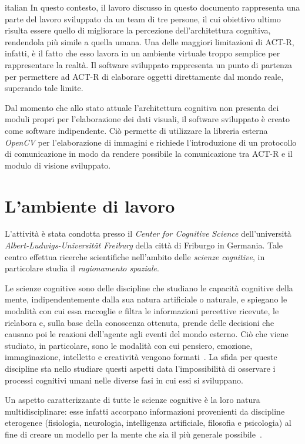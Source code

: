 \begin{otherlanguage*}{italian}
	In questo contesto, il lavoro discusso in questo documento rappresenta una parte del lavoro sviluppato da un team di tre persone, il cui obiettivo ultimo risulta essere quello di migliorare la percezione dell'architettura cognitiva, rendendola più simile a quella umana.  
	Una delle maggiori limitazioni di \mbox{ACT-R}, infatti, è il fatto che esso lavora in un ambiente virtuale troppo semplice per rappresentare la realtà. 
	Il software sviluppato rappresenta un punto di partenza per permettere ad \mbox{ACT-R} di elaborare oggetti direttamente dal mondo reale, superando tale limite.
	 
	Dal momento che allo stato attuale l'architettura cognitiva non presenta dei moduli propri per l'elaborazione dei dati visuali, il software sviluppato è creato come software indipendente. 
	Ciò permette di utilizzare la libreria esterna \mbox{\emph{OpenCV}} per l'elaborazione di immagini e richiede l'introduzione di un protocollo di comunicazione in modo da rendere possibile la comunicazione tra \mbox{ACT-R} e il modulo di visione sviluppato.

	\section*{L'ambiente di lavoro}
	L'attività è stata condotta presso il \emph{Center for Cognitive Science} dell'università \emph{Albert-Ludwigs-Universität Freiburg} della città di Friburgo in Germania. 
	Tale centro effettua ricerche scientifiche nell'ambito delle \emph{scienze cognitive}, in particolare studia il \emph{ragionamento spaziale}.

	Le scienze cognitive sono delle discipline che studiano le capacità cognitive della mente, indipendentemente dalla sua natura artificiale o naturale, e spiegano le modalità con cui essa raccoglie e filtra le informazioni percettive ricevute, le rielabora e, sulla base della conoscenza ottenuta, prende delle decisioni che causano poi le reazioni dell'agente agli eventi del mondo esterno. 
	Ciò che viene studiato, in particolare, sono le modalità con cui pensiero, emozione, immaginazione, intelletto e creatività vengono formati~\cite{legrenzi2005prima}.
	La sfida per queste discipline sta nello studiare questi aspetti data l'impossibilità di osservare i processi cognitivi umani nelle diverse fasi in cui essi si sviluppano. 
	
	Un aspetto caratterizzante di tutte le scienze cognitive è la loro natura multidisciplinare: esse infatti accorpano informazioni provenienti da discipline eterogenee (fisiologia, neurologia, intelligenza artificiale, filosofia e psicologia) al fine di creare un modello per la mente che sia il più generale possibile~\cite{legrenzi2005prima}. 


\end{otherlanguage*}
